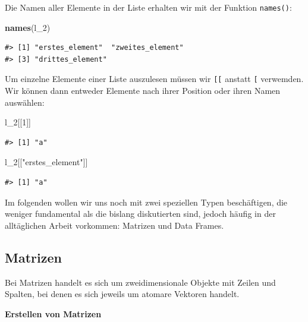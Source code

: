 \documentclass[]{tufte-book}
\newenvironment{Shaded}{}{}
\newcommand{\KeywordTok}[1]{\textcolor[rgb]{0.00,0.44,0.13}{\textbf{#1}}}
\newcommand{\DecValTok}[1]{\textcolor[rgb]{0.25,0.63,0.44}{#1}}
\newcommand{\StringTok}[1]{\textcolor[rgb]{0.25,0.44,0.63}{#1}}
\newcommand{\NormalTok}[1]{#1}
\begin{document}
Die Namen aller Elemente in der Liste erhalten wir mit der Funktion
\texttt{names()}:

\begin{Shaded}
\begin{Highlighting}[]
\KeywordTok{names}\NormalTok{(l_}\DecValTok{2}\NormalTok{)}
\end{Highlighting}
\end{Shaded}

\begin{verbatim}
#> [1] "erstes_element"  "zweites_element"
#> [3] "drittes_element"
\end{verbatim}

Um einzelne Elemente einer Liste auszulesen müssen wir \texttt{{[}{[}}
anstatt \texttt{{[}} verwemden. Wir können dann entweder Elemente nach
ihrer Position oder ihren Namen auswählen:

\begin{Shaded}
\begin{Highlighting}[]
\NormalTok{l_}\DecValTok{2}\NormalTok{[[}\DecValTok{1}\NormalTok{]]}
\end{Highlighting}
\end{Shaded}

\begin{verbatim}
#> [1] "a"
\end{verbatim}

\begin{Shaded}
\begin{Highlighting}[]
\NormalTok{l_}\DecValTok{2}\NormalTok{[[}\StringTok{"erstes_element"}\NormalTok{]]}
\end{Highlighting}
\end{Shaded}

\begin{verbatim}
#> [1] "a"
\end{verbatim}

Im folgenden wollen wir uns noch mit zwei speziellen Typen beschäftigen,
die weniger fundamental als die bislang diskutierten sind, jedoch häufig
in der alltäglichen Arbeit vorkommen: Matrizen und Data Frames.

\subsection{Matrizen}\label{matrizen}

Bei Matrizen handelt es sich um zweidimensionale Objekte mit Zeilen und
Spalten, bei denen es sich jeweils um atomare Vektoren handelt.

\textbf{Erstellen von Matrizen}
\end{document}
